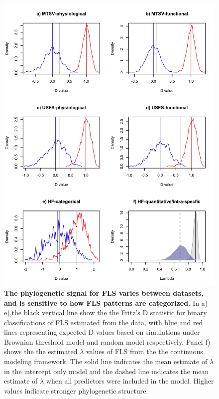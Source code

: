 \documentclass[11pt]{article}\usepackage[]{graphicx}\usepackage[]{color}
\begin{document}
\begin{figure}[H]
\centering
\includegraphics[height=0.8\textheight]{..//..//phylosig.jpeg} 
  \caption{\textbf{The phylogenetic signal for FLS varies between datasets, and is sensitive to how FLS patterns are categorized.} In a)-e),the black vertical line show the the Fritz's D statistic for binary classifications of FLS estimated from the data, with blue and red lines representing expected D values based on simulations under Brownian threshold model and random model respectively. Panel f) shows the the estimated $\lambda$ values of FLS from the the continuous modeling framework. The solid line indicates the mean estimate of $\lambda$ in the intercept only model and the dashed line indicates the mean estimate of $\lambda$ when all predictors were included in the model. Higher values indicate stronger phylogenetic structure.}
    \label{fig:Dstat}
    \end{figure}
\end{document}
